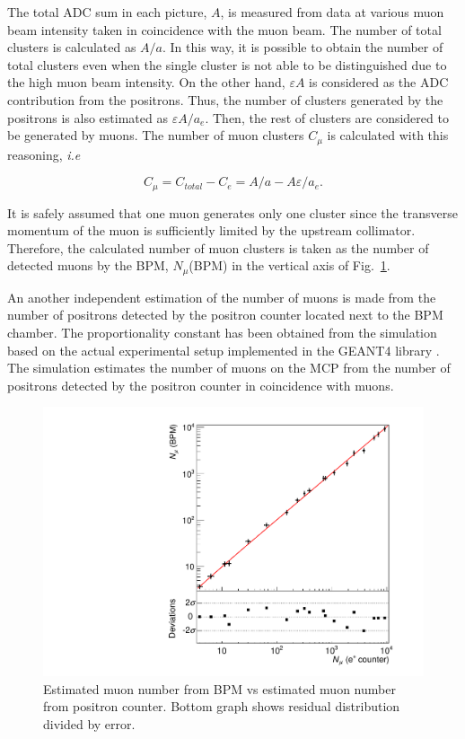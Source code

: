 \documentclass[preprint,3p,twocolumn]{elsarticle}
\begin{document}
The total ADC sum in each picture, $A$, is measured from data at various muon beam intensity taken in coincidence with the muon beam.
The number of total clusters is calculated as $A/a$. In this way, it is possible to obtain the number of total clusters even when the single cluster is not able to be distinguished due to the high muon beam intensity.
On the other hand, $\varepsilon A$ is considered as the ADC contribution from the positrons. Thus, the number of clusters generated by the positrons is also estimated as $\varepsilon A/a_e$. Then, the rest of clusters are considered to be generated by muons. The number of muon clusters $C_{\mu}$ is calculated with this reasoning, {\it i.e}
\begin{linenomath}
\begin{equation}
C_{\mu} = C_{total} - C_{e}= A/a - A\varepsilon/a_e.
\end{equation}
\end{linenomath}

It is safely assumed that one muon generates only one cluster since the transverse momentum of the muon is sufficiently limited by the upstream collimator. Therefore, the calculated number of muon clusters is taken as the number of detected muons by the BPM, $N_{\mu}$(BPM) in the vertical axis of Fig.~\ref{fig:muvsmu}.

An another independent estimation of the number of muons is made from the number of positrons detected by the positron counter located next to the BPM chamber. The proportionality constant has been obtained from the simulation based on the actual experimental setup implemented in the GEANT4 library \cite{geant4}. 
The simulation estimates the number of muons on the MCP from the number of positrons detected by the positron counter in coincidence with muons. 
\begin{figure}[tbp]
	\centering
	\includegraphics[width=\columnwidth]{figure/lin.pdf}
\caption{Estimated muon number from BPM vs estimated muon number from positron counter. 
Bottom graph shows residual distribution divided by error.}
\label{fig:muvsmu}
\end{figure}
\end{document}
